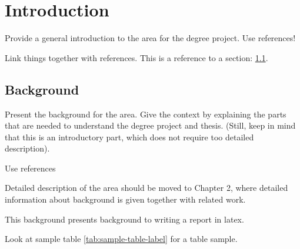 \section{Introduction}

Provide a general introduction to the area for the degree project. Use references!

Link things together with references. This is a reference to a section: \ref{sec:background}.

\subsection{Background}
\label{sec:background}
Present the background for the area. Give the context by explaining the parts that are needed to understand the degree project and thesis. (Still, keep in mind that this is an introductory part, which does not require too detailed description).

Use references

Detailed description of the area should be moved to Chapter 2, where detailed information about background is given together with related work. 

This background presents background to writing a report in latex.

Look at sample table \ref{tab:sample-table-label} for a table sample.



